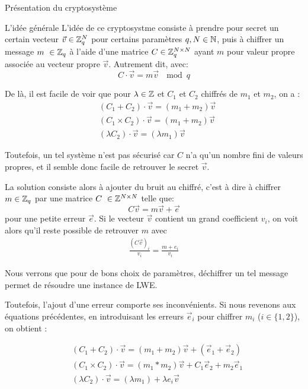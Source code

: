 \begin{section}{Présentation du cryptosystème}
	\begin{subsection}{L'idée générale}
	L'idée de ce cryptosystme consiste à prendre pour secret un
	certain vecteur $\vec{v} \in \mathbb{Z}_q^N$ pour certains paramètres
	$q, N \in \mathbb{N}$, puis à chiffrer un message $m \in \ZZq$ à
	l'aide d'une matrice $C \in \mathbb{Z}_q^{N \times N}$ ayant $m$ pour valeur propre 
	associée au vecteur propre $\vec{v}$. Autrement dit, avec:
	\[C \cdot \vec{v} = m \vec{v}\: \mod q \]

	De là, il est facile de voir que pour $\lambda \in \mathbb{Z}$ et  $C_1$ et $C_2$ 
	chiffrés de $m_1$ et $m_2$, on a :
	\begin{align*}
	& (C_1 + C_2) \cdot \vec{v} = (m_1 + m_2) \vec{v} \\
	& (C_1 \times C_2) \cdot \vec{v} = (m_1 + m_2) \vec{v} \\
	& (\lambda  C_2) \cdot \vec{v} = (\lambda m_1) \vec{v} 
	\end{align*}

	Toutefois, un tel système n'est pas sécurisé car $C$ n'a qu'un nombre
	fini de valeurs propres, et il semble donc facile de 
	retrouver le secret $\vec{v}$.

	La solution consiste alors à ajouter du bruit au chiffré, c'est à dire
	à chiffrer $m\in \ZZq$ par une matrice $C \in \ZZ^{N \times N}$
	telle que:
	\[ C \vec{v} = m \vec{v} + \vec{e} \]
	pour une \og petite \fg erreur $\vec{e}$. Si le vecteur
	$\vec{v}$ contient un grand coefficient $v_i$, on voit alors qu'il 
	reste possible de retrouver $m$ avec
	\begin{align*}
	\frac{{(C \vec{v})}_i}{v_i} = \frac{m + e_i}{v_i}
	\end{align*}
	
		Nous verrons que pour de bons
	choix de paramètres, déchiffrer un tel message permet de
	résoudre une instance de LWE.

	Toutefois, l'ajout d'une erreur comporte ses inconvénients. Si nous
	revenons aux équations précédentes, en introduisant les erreurs 
	$\vec{e}_i$ pour chiffrer  $m_i$ ($i\in \{1,2\}$), on obtient :

	\begin{align*}
	& (C_1 + C_2) \cdot \vec{v} = (m_1 + m_2) \vec{v} + (\vec{e}_1 + \vec{e}_2)\\
		& (C_1 \times C_2) \cdot \vec{v} = (m_1 * m_2) \vec{v} + C_1
		\vec{e}_2 + m_2\vec{e}_1 \\
	& (\lambda  C_2) \cdot \vec{v} = (\lambda m_1) + \lambda e_i\vec{v} 
	\end{align*}


\end{subsection}
\end{section}
